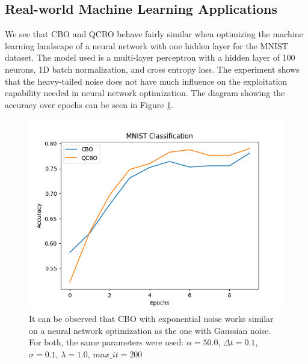 \documentclass[a4paper, 11pt]{article}
\begin{document}
\subsection{Real-world Machine Learning Applications}
We see that CBO and QCBO behave fairly similar when optimizing the machine learning landscape of a neural network with one hidden layer for the MNIST dataset. The model used is a multi-layer perceptron with a hidden layer of 100 neurons, 1D batch normalization, and cross entropy loss. The experiment shows that the heavy-tailed noise does not have much influence on the exploitation capability needed in neural network optimization. The diagram showing the accuracy over epochs can be seen in Figure \ref{fig:mnist}. 

\begin{figure}[!ht]
\centering
\includegraphics[width=1\textwidth]{imgs/mnist.png}

\caption{It can be observed that CBO with exponential noise works similar on a neural network optimization as the one with Gaussian noise. For both, the same parameters were used: $\alpha = 50.0$, $\Delta t = 0.1$, $\sigma = 0.1$, $\lambda = 1.0$, $max\_it = 200$} \vspace{-1em}
\label{fig:mnist}
\end{figure}
\end{document}
